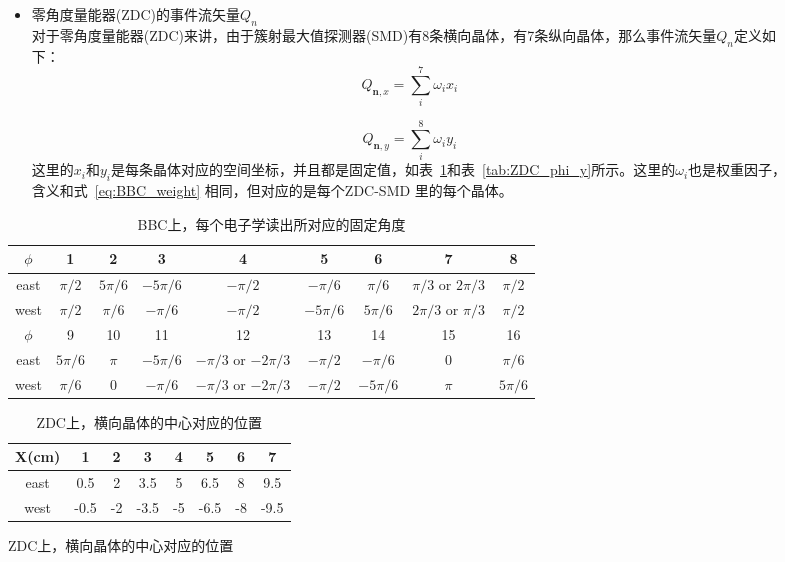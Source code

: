 \begin{figure}[htbp]
\begin{itemize}
\item 零角度量能器(ZDC)的事件流矢量$Q_{n}$ \\
对于零角度量能器(ZDC)来讲，由于簇射最大值探测器(SMD)有8条横向晶体，有7条纵向晶体，那么事件流矢量$Q_{n}$定义如下：
\begin{equation}
\label{eq:ZDC_Qn_x}
Q_{\textbf{n},x} = \sum_{i}^{7}\omega_{i}x_{i}
\end{equation}

\begin{equation}
\label{eq:ZDC_Qn_y}
Q_{\textbf{n},y} = \sum_{i}^{8}\omega_{i}y_{i}
\end{equation}
这里的$x_{i}$和$y_{i}$是每条晶体对应的空间坐标，并且都是固定值，如表~\ref{tab:ZDC_phi_x}和表~\ref{tab:ZDC_phi_y}所示。这里的$\omega_{i}$也是权重因子，含义和式~\ref{eq:BBC_weight} 相同，但对应的是每个ZDC-SMD 里的每个晶体。
\end{itemize}

\begin{table}[htb]
\label{tab:BBC_phi}
\caption{BBC上，每个电子学读出所对应的固定角度}
\begin{tabular}{|c|c|c|c|c|c|c|c|c|}
\hline
\hline
$\phi$  &1        & 2        & 3         & 4         & 5          & 6         & 7                    & 8           \\ \hline
east    &$\pi/2$  & $5\pi/6$ & $-5\pi/6$ & $-\pi/2$  & $-\pi/6$   & $\pi/6$   & $\pi/3$ or $2\pi/3$  & $\pi/2$     \\ \hline
west    &$\pi/2$  & $\pi/6$  & $-\pi/6$  & $-\pi/2$  & $-5\pi/6$  & $5\pi/6$  & $2\pi/3$ or $\pi/3$  & $\pi/2$     \\ \hline
$\phi$  &9        & 10       & 11        & 12                     &13         & 14         & 15      & 16           \\ \hline
east    &$5\pi/6$ & $\pi$    & $-5\pi/6$ & $-\pi/3$ or $-2\pi/3$  & $-\pi/2$  & $-\pi/6$   & 0       & $\pi/6$      \\ \hline
west    &$\pi/6$  & 0        & $-\pi/6$  & $-\pi/3$ or $-2\pi/3$  & $-\pi/2$  & $-5\pi/6$  & $\pi$   & $5\pi/6$    \\ \hline \hline
\end{tabular}
\end{table}

\begin{table}[htb]
\centering
\label{tab:ZDC_phi_x}
\caption{ZDC上，横向晶体的中心对应的位置}
\begin{tabular}{|c|c|c|c|c|c|c|c|}
\hline
\hline
X(cm)   &1    &2  &3    &4  &5    &6  &7      \\ \hline
east    &0.5  &2  &3.5  &5  &6.5  &8  &9.5    \\ \hline
west    &-0.5 &-2 &-3.5 &-5 &-6.5 &-8 &-9.5   \\ \hline \hline
\end{tabular}
\end{table}


\end{figure}
